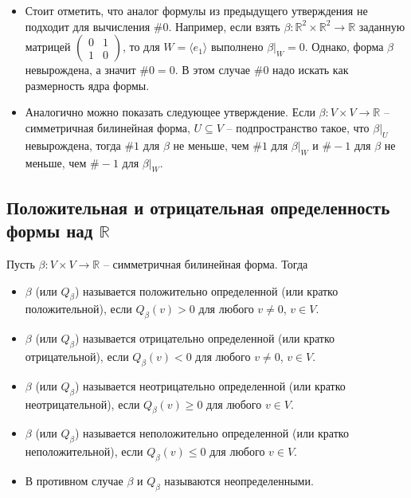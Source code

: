 \begin{itemize}
\item Стоит отметить, что аналог формулы из предыдущего утверждения не подходит для вычисления $\#0$.
Например, если взять $\beta\colon \mathbb R^2 \times \mathbb R^2 \to \mathbb R$ заданную матрицей $\left(\begin{smallmatrix}{0}&{1}\\{1}&{0}\end{smallmatrix}\right)$, то для $W = \langle e_1\rangle$ выполнено $\beta|_W = 0$.
Однако, форма $\beta$ невырождена, а значит $\#0 = 0$.
В этом случае $\#0$ надо искать как размерность ядра формы.

\item Аналогично можно показать следующее утверждение.
Если $\beta\colon V\times V\to \mathbb R$ -- симметричная билинейная форма, $U\subseteq V$ -- подпространство такое, что $\beta|_U$ невырождена, тогда $\# 1$ для $\beta$ не меньше, чем $\# 1$ для $\beta|_W$ и $\#-1$ для $\beta$ не меньше, чем $\#-1$ для $\beta|_W$.
\end{itemize}

\subsection{Положительная и отрицательная определенность формы над $\mathbb R$}

\begin{definition}
Пусть $\beta\colon V\times V\to \mathbb R$ -- симметричная билинейная форма.
Тогда
\begin{itemize}
\item $\beta$ (или $Q_\beta$) называется положительно определенной (или кратко положительной), если $Q_\beta(v) > 0$ для любого $v\neq 0$, $v\in V$.

\item $\beta$ (или $Q_\beta$) называется отрицательно определенной (или кратко отрицательной), если $Q_\beta(v) < 0$ для любого $v\neq 0$, $v\in V$.

\item $\beta$ (или $Q_\beta$) называется неотрицательно определенной (или кратко неотрицательной), если $Q_\beta(v) \geqslant 0$ для любого $v\in V$.

\item $\beta$ (или $Q_\beta$) называется неположительно определенной (или кратко неположительной), если $Q_\beta(v) \leqslant 0$ для любого $v\in V$.

\item В противном случае $\beta$ и $Q_\beta$ называются неопределенными.
\end{itemize}
\end{definition}

